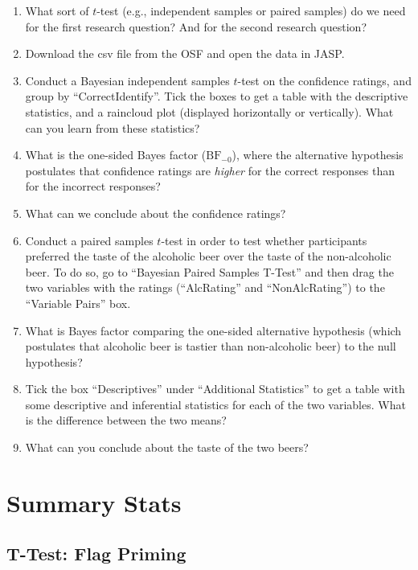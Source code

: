\documentclass[
  letterpaper,
  DIV=11,
  numbers=noendperiod]{scrreprt}
\providecommand{\tightlist}{%
  \setlength{\itemsep}{0pt}\setlength{\parskip}{0pt}}\usepackage{longtable,booktabs,array}
\begin{document}
\begin{enumerate}
\def\labelenumi{\arabic{enumi}.}
\tightlist
\item
  What sort of \(t\)-test (e.g., independent samples or paired samples)
  do we need for the first research question? And for the second
  research question?
\item
  Download the csv file from the OSF and open the data in JASP.
\item
  Conduct a Bayesian independent samples \(t\)-test on the confidence
  ratings, and group by ``CorrectIdentify''. Tick the boxes to get a
  table with the descriptive statistics, and a raincloud plot (displayed
  horizontally or vertically). What can you learn from these statistics?
\item
  What is the one-sided Bayes factor (\(\text{BF}_{-0}\)), where the
  alternative hypothesis postulates that confidence ratings are
  \emph{higher} for the correct responses than for the incorrect
  responses?
\item
  What can we conclude about the confidence ratings?
\item
  Conduct a paired samples \(t\)-test in order to test whether
  participants preferred the taste of the alcoholic beer over the taste
  of the non-alcoholic beer. To do so, go to ``Bayesian Paired Samples
  T-Test'' and then drag the two variables with the ratings
  (``AlcRating'' and ``NonAlcRating'') to the ``Variable Pairs'' box.
\item
  What is Bayes factor comparing the one-sided alternative hypothesis
  (which postulates that alcoholic beer is tastier than non-alcoholic
  beer) to the null hypothesis?
\item
  Tick the box ``Descriptives'' under ``Additional Statistics'' to get a
  table with some descriptive and inferential statistics for each of the
  two variables. What is the difference between the two means?
\item
  What can you conclude about the taste of the two beers?
\end{enumerate}

\hypertarget{summary-stats}{%
\section{Summary Stats}\label{summary-stats}}

\hypertarget{t-test-flag-priming}{%
\subsection{T-Test: Flag Priming}\label{t-test-flag-priming}}
\end{document}
